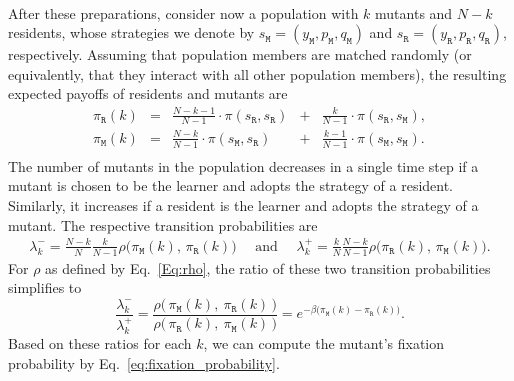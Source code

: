 \documentclass[11pt]{article}
\def\resident{\texttt{R}}
\def\mutant{\texttt{M}}
\def\strategy{s}
\theoremstyle{plainCl1}
\theoremstyle{plainCl2}
\begin{document}
~\\
\noindent
After these preparations, consider now a population with \(k\) mutants and \(N - k\) residents, whose strategies we denote by \(\strategy_\mutant=(y_\mutant,p_\mutant, q_\mutant)\) and \(\strategy_\resident = (y_\resident, p_\resident, q_\resident)\), respectively.
Assuming that population members are matched randomly (or equivalently, that they interact with all other population members), the resulting expected payoffs of residents and mutants are
\begin{equation} \label{Eq:ExpPay}
  \begin{array}{lcrcr}
  \displaystyle \pi_\resident(k)& = &\displaystyle \frac{N\!-\!k\!-\!1}{N-1}\cdot \pi(\strategy_\resident,\strategy_\resident)	&+	&\displaystyle\frac{k}{N-1}\cdot \pi(\strategy_\resident,\strategy_\mutant),\\[0.5cm]
  \displaystyle \pi_\mutant(k)& = &\displaystyle\frac{N-k}{N-1}\cdot \pi(\strategy_\mutant,\strategy_\resident) &+	&\displaystyle\frac{k-1}{N-1}\cdot \pi(\strategy_\mutant,\strategy_\mutant).\\
  \end{array}
\end{equation}
The number of mutants in the population decreases in a single time step if a mutant is chosen to be the learner and adopts the strategy
of a resident. 
Similarly, it increases if a resident is the learner and adopts the strategy of a mutant. 
The respective transition probabilities are 
\begin{align*}
  \lambda^-_k \!=\! \frac{N-k}{N}\frac{k}{N-1}\rho\big(\pi_\mutant(k),\,\pi_\resident(k)\big) \quad \text{ and } \quad \lambda^+_k \!=\!\frac{k}{N}\frac{N-k}{N-1}\rho\big(\pi_\resident(k),\,\pi_\mutant(k)\big).
\end{align*}
For $\rho$ as defined by Eq.~\eqref{Eq:rho}, the ratio of these two transition probabilities simplifies to 
\begin{equation} \label{eq:LambdaRatio}
 \frac{\lambda^-_k}{\lambda^+_k} \!=\!  \frac{\rho\big(\,\pi_\mutant(k),~\pi_\resident(k)\,\big)}{\rho\big(\,\pi_\resident(k),~\pi_\mutant(k)\,\big)} 
 =e^{-\beta\big(\pi_\mutant(k)-\pi_\resident(k)\big)}.
\end{equation}
Based on these ratios for each $k$, we can compute the mutant's fixation probability by Eq.~\eqref{eq:fixation_probability}. 

\end{document}
